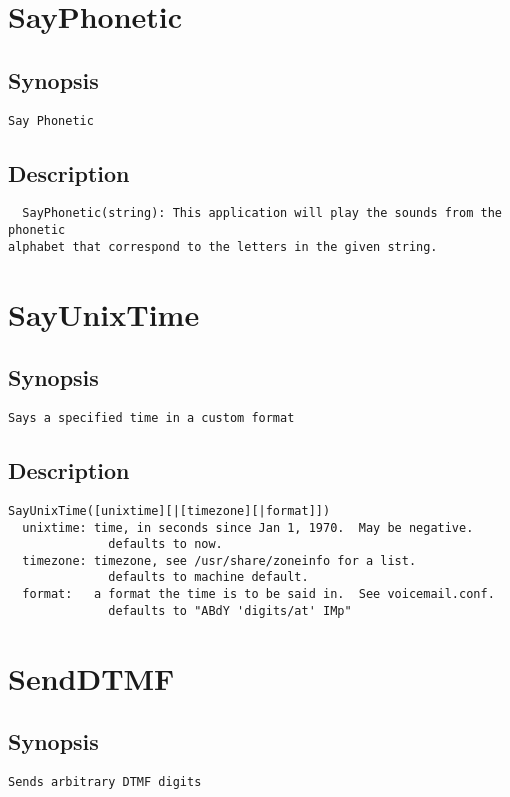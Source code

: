 \section{SayPhonetic}
\subsection{Synopsis}
\begin{verbatim}
Say Phonetic
\end{verbatim}
\subsection{Description}
\begin{verbatim}
  SayPhonetic(string): This application will play the sounds from the phonetic
alphabet that correspond to the letters in the given string.

\end{verbatim}


\section{SayUnixTime}
\subsection{Synopsis}
\begin{verbatim}
Says a specified time in a custom format
\end{verbatim}
\subsection{Description}
\begin{verbatim}
SayUnixTime([unixtime][|[timezone][|format]])
  unixtime: time, in seconds since Jan 1, 1970.  May be negative.
              defaults to now.
  timezone: timezone, see /usr/share/zoneinfo for a list.
              defaults to machine default.
  format:   a format the time is to be said in.  See voicemail.conf.
              defaults to "ABdY 'digits/at' IMp"

\end{verbatim}


\section{SendDTMF}
\subsection{Synopsis}
\begin{verbatim}
Sends arbitrary DTMF digits
\end{verbatim}
